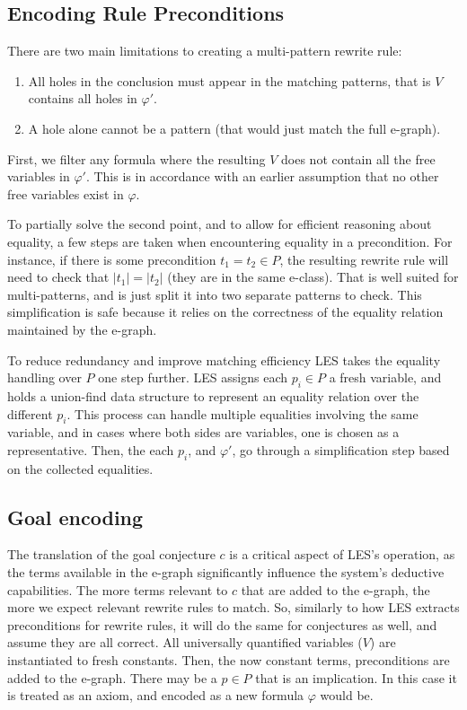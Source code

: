 \subsection{Encoding Rule Preconditions}
\label{translation:les:conditions}

There are two main limitations to creating a multi-pattern rewrite rule:
\begin{enumerate}
    \item All holes in the conclusion must appear in the matching patterns, that is $V$ contains all holes in $\varphi'$.
    \item A hole alone cannot be a pattern (that would just match the full e-graph).
\end{enumerate}

First, we filter any formula where the resulting $V$ does not contain all the free variables in $\varphi'$.
This is in accordance with an earlier assumption that no other free variables exist in $\varphi$.

To partially solve the second point, and to allow for efficient reasoning about equality, a few steps are taken when encountering equality in a precondition.
For instance, if there is some precondition $t_1 = t_2 \in P$, the resulting rewrite rule will need to check that $|t_1| = |t_2|$ (they are in the same e-class).
That is well suited for multi-patterns, and is just split it into two separate patterns to check.
This simplification is safe because it relies on the correctness of the equality relation maintained by the e-graph.

To reduce redundancy and improve matching efficiency LES takes the equality handling over $P$ one step further.
LES assigns each $p_i \in P$ a fresh variable, and holds a union-find data structure to represent an equality relation over the different $p_i$.
This process can handle multiple equalities involving the same variable, and in cases where both sides are variables, one is chosen as a representative.
Then, the each $p_i$, and $\varphi'$, go through a simplification step based on the collected equalities.

\subsection{Goal encoding}
\label{translation:les:goal}

The translation of the goal conjecture $c$ is a critical aspect of LES's operation, as the terms available in the e-graph significantly influence the system's deductive capabilities.
The more terms relevant to $c$ that are added to the e-graph, the more we expect relevant rewrite rules to match.
So, similarly to how LES extracts preconditions for rewrite rules, it will do the same for conjectures as well, and assume they are all correct.
All universally quantified variables ($V$) are instantiated to fresh constants.
Then, the now constant terms, preconditions are added to the e-graph.
There may be a $p \in P$ that is an implication.
In this case it is treated as an axiom, and encoded as a new formula $\varphi$ would be.

